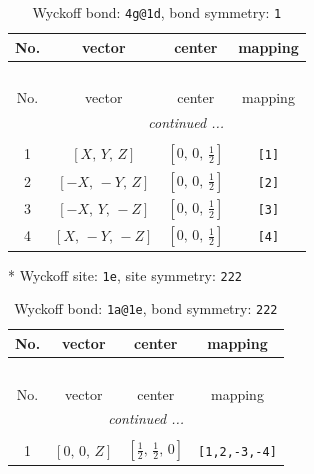 \documentclass[fleqn,8pt]{jsarticle}
\begin{document}
\begin{longtable}{cccc}
\caption{Wyckoff bond: {\tt 4g@1d}, bond symmetry: {\tt 1}}
 \\
 \hline \hline
No. & vector & center & mapping \\ \hline \endfirsthead

\multicolumn{3}{l}{\tablename\ \thetable{}} \\
 \hline \hline
No. & vector & center & mapping \\ \hline \endhead

 \hline \hline
\multicolumn{3}{r}{\footnotesize\it continued ...} \\ \endfoot

 \hline \hline
\multicolumn{3}{r}{} \\ \endlastfoot

1 & $\left[ X,\, Y,\, Z \right]$ & $\left[ 0,\, 0,\, \frac{1}{2} \right]$ & {\tt [1]} \\ \hline
2 & $\left[ - X,\, - Y,\, Z \right]$ & $\left[ 0,\, 0,\, \frac{1}{2} \right]$ & {\tt [2]} \\ \hline
3 & $\left[ - X,\, Y,\, - Z \right]$ & $\left[ 0,\, 0,\, \frac{1}{2} \right]$ & {\tt [3]} \\ \hline
4 & $\left[ X,\, - Y,\, - Z \right]$ & $\left[ 0,\, 0,\, \frac{1}{2} \right]$ & {\tt [4]} \\
\end{longtable}
* Wyckoff site: {\tt 1e}, site symmetry: {\tt 222}
\renewcommand{\arraystretch}{1.2}
\begin{longtable}{cccc}
\caption{Wyckoff bond: {\tt 1a@1e}, bond symmetry: {\tt 222}}
 \\
 \hline \hline
No. & vector & center & mapping \\ \hline \endfirsthead

\multicolumn{3}{l}{\tablename\ \thetable{}} \\
 \hline \hline
No. & vector & center & mapping \\ \hline \endhead

 \hline \hline
\multicolumn{3}{r}{\footnotesize\it continued ...} \\ \endfoot

 \hline \hline
\multicolumn{3}{r}{} \\ \endlastfoot

1 & $\left[ 0,\, 0,\, Z \right]$ & $\left[ \frac{1}{2},\, \frac{1}{2},\, 0 \right]$ & {\tt [1,2,-3,-4]} \\
\end{longtable}
\renewcommand{\arraystretch}{1.2}
\end{document}
